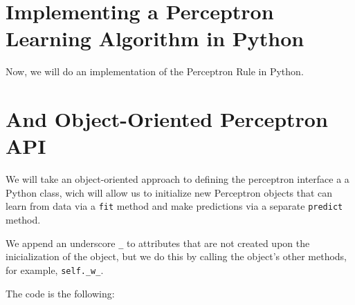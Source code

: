 \documentclass[../machine_learning_scikit.tex]{subfiles}
\begin{document}
    \section{Implementing a Perceptron Learning Algorithm in Python}

    Now, we will do an implementation of the Perceptron Rule in Python.

    \section{And Object-Oriented Perceptron API}

    We will take an object-oriented approach to defining the perceptron interface a a Python class, wich will allow us to initialize new Perceptron objects that can learn from data via a \lstinline|fit| method and make predictions via a separate \lstinline|predict| method.

    \begin{obs}
        We append an underscore \lstinline|_| to attributes that are not created upon the inicialization of the object, but we do this by calling the object's other methods, for example, \lstinline|self._w_|.
    \end{obs}

    The code is the following:
\end{document}
